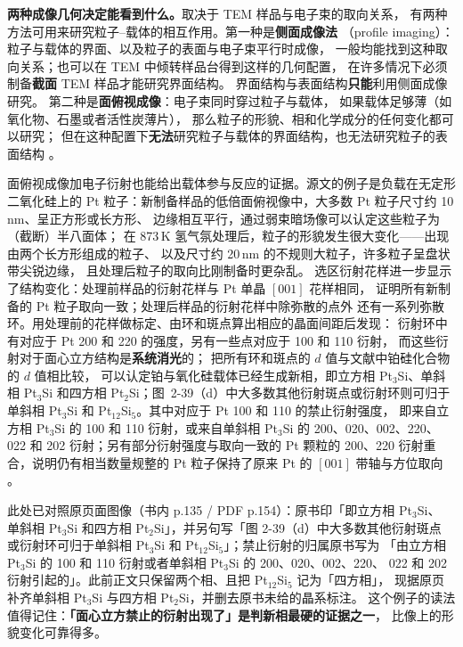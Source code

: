 \textbf{两种成像几何决定能看到什么。}取决于 TEM 样品与电子束的取向关系，
有两种方法可用来研究粒子--载体的相互作用。第一种是\textbf{侧面成像法}
（profile imaging）：粒子与载体的界面、以及粒子的表面与电子束平行时成像，
一般均能找到这种取向关系；也可以在 TEM 中倾转样品台得到这样的几何配置，
在许多情况下必须制备\textbf{截面} TEM 样品才能研究界面结构。
界面结构与表面结构\textbf{只能}利用侧面成像研究。
第二种是\textbf{面俯视成像}：电子束同时穿过粒子与载体，
如果载体足够薄（如氧化物、石墨或者活性炭薄片），
那么粒子的形貌、相和化学成分的任何变化都可以研究；
但在这种配置下\textbf{无法}研究粒子与载体的界面结构，也无法研究粒子的表面结构
。

面俯视成像加电子衍射也能给出载体参与反应的证据。源文的例子是负载在无定形二氧化硅上的
Pt 粒子：新制备样品的低倍面俯视像中，大多数 Pt 粒子尺寸约 10\,nm、呈正方形或长方形、
边缘相互平行，通过弱束暗场像可以认定这些粒子为（截断）半八面体；
在 873\,K 氢气氛处理后，粒子的形貌发生很大变化——出现由两个长方形组成的粒子、
以及尺寸约 20\,nm 的不规则大粒子，许多粒子呈盘状带尖锐边缘，
且处理后粒子的取向比刚制备时更杂乱。
选区衍射花样进一步显示了结构变化：处理前样品的衍射花样与 Pt 单晶 $[001]$ 花样相同，
证明所有新制备的 Pt 粒子取向一致；处理后样品的衍射花样中除弥散的点外
还有一系列弥散环。用处理前的花样做标定、由环和斑点算出相应的晶面间距后发现：
衍射环中有对应于 Pt 200 和 220 的强度，另有一些点对应于 100 和 110 衍射，
而这些衍射对于面心立方结构是\textbf{系统消光}的；
把所有环和斑点的 $d$ 值与文献中铂硅化合物的 $d$ 值相比较，
可以认定铂与氧化硅载体已经生成新相，即立方相 Pt$_3$Si、单斜相 Pt$_3$Si
和四方相 Pt$_2$Si；图~2-39（d）中大多数其他衍射斑点或衍射环则可归于
单斜相 Pt$_3$Si 和 Pt$_{12}$Si$_5$。其中对应于 Pt 100 和 110 的禁止衍射强度，
即来自立方相 Pt$_3$Si 的 100 和 110 衍射，或来自单斜相 Pt$_3$Si 的
200、020、002、220、022 和 202 衍射；另有部分衍射强度与取向一致的 Pt 颗粒的
200、220 衍射重合，说明仍有相当数量规整的 Pt 粒子保持了原来 Pt 的
$[001]$ 带轴与方位取向
。

此处已对照原页面图像（书内 p.135 / PDF p.154）：原书印「即立方相 Pt$_3$Si、
单斜相 Pt$_3$Si 和四方相 Pt$_2$Si」，并另句写「图 2-39（d）中大多数其他衍射斑点
或衍射环可归于单斜相 Pt$_3$Si 和 Pt$_{12}$Si$_5$」；禁止衍射的归属原书写为
「由立方相 Pt$_3$Si 的 100 和 110 衍射或者单斜相 Pt$_3$Si 的 200、020、002、220、
022 和 202 衍射引起的」。此前正文只保留两个相、且把 Pt$_{12}$Si$_5$ 记为「四方相」，
现据原页补齐单斜相 Pt$_3$Si 与四方相 Pt$_2$Si，并删去原书未给的晶系标注。
这个例子的读法值得记住：\textbf{「面心立方禁止的衍射出现了」是判新相最硬的证据之一}，
比像上的形貌变化可靠得多。


